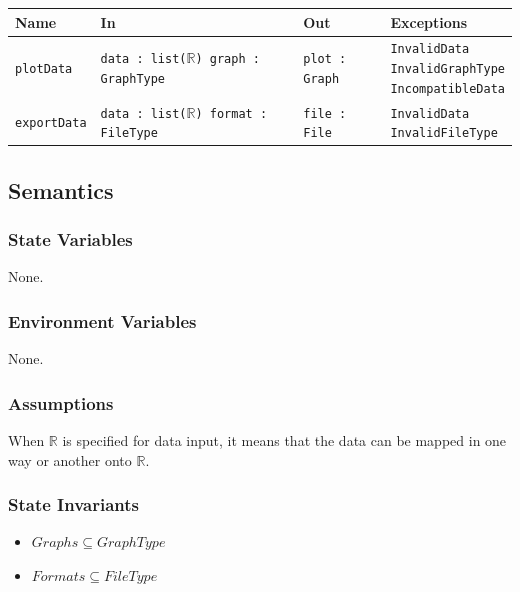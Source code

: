 \documentclass[12pt, titlepage]{article}
\begin{document}
\begin{center}
\begin{tabularx}{\textwidth}{p{5.5em} X X X}
\hline
\textbf{Name} & \textbf{In} & \textbf{Out} & \textbf{Exceptions} \\
\hline
\texttt{plotData} &
\parbox[t]{\hsize}{\texttt{data : list($\mathbb{R}$) \\ graph : GraphType}} &
\texttt{plot : Graph} &
\parbox[t]{\hsize}{\texttt{InvalidData \\ InvalidGraphType \\ IncompatibleData}} \\

\texttt{exportData} &
\parbox[t]{\hsize}{\texttt{data : list($\mathbb{R}$) \\ format : FileType}} &
\texttt{file : File} &
\parbox[t]{\hsize}{\texttt{InvalidData \\ InvalidFileType}} \\
\hline
\end{tabularx}
\end{center}

\subsection{Semantics}

\subsubsection{State Variables}
None.

\subsubsection{Environment Variables}
None.

\subsubsection{Assumptions}
When $\mathbb{R}$ is specified for data input, it means that the data can be mapped in one way or another onto
$\mathbb{R}$.

\subsubsection{State Invariants}

\begin{itemize}
  \item $Graphs \subseteq GraphType$
  \item $Formats \subseteq FileType$
\end{itemize}
\end{document}
